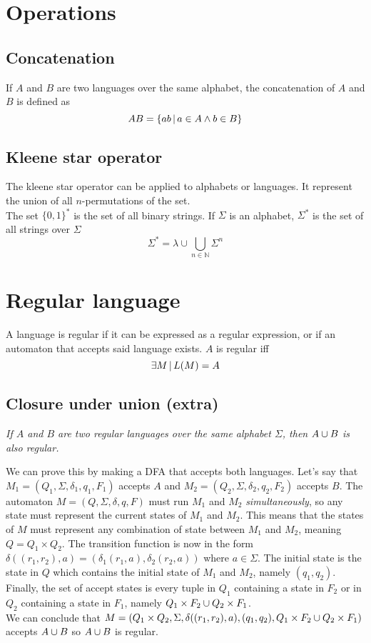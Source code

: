 \documentclass{article}
\newcommand{\emptyString}{\lambda}
\begin{document}
\section{Operations}

\subsection{Concatenation}

If \(A\) and \(B\) are two languages over the same alphabet,
the concatenation of \(A\) and \(B\) is defined as
\[
    AB = \{ab \,|\, a \in A \land b \in B\}
\]

\subsection{Kleene star operator}

The kleene star operator can be applied to alphabets or languages.
It represent the union of all \(n\)-permutations of the set. \\
The set \(\{0,1\}^*\) is the set of
all binary strings. If \(\Sigma\) is an alphabet, \(\Sigma^*\) is the set
of all strings over \(\Sigma\)
\[
    \Sigma^* = \emptyString \cup \bigcup_{n\in\mathbb{N}} \Sigma^n
\]

\section{Regular language}

A language is regular if it can be expressed as a regular expression,
or if an automaton that accepts said language exists.
\(A\) is regular iff
\[
    \exists M \,|\, L(M) = A
\]

\subsection{Closure under union (extra)}

\textit{If \(A\) and \(B\) are two regular languages over the same alphabet
\(\Sigma\), then \(A \cup B\) is also regular.}

We can prove this by making a DFA that accepts both languages.
Let's say that \(M_1=(Q_1, \Sigma, \delta_1, q_1, F_1)\) accepts \(A\)
and \(M_2=(Q_2, \Sigma, \delta_2, q_2, F_2)\) accepts \(B\).
The automaton \(M=(Q, \Sigma, \delta, q, F)\) must run \(M_1\) and \(M_2\) \textit{simultaneously},
so any state must represent the current states of \(M_1\) and \(M_2\).
This means that the states of \(M\) must represent any combination of state between
\(M_1\) and \(M_2\), meaning \(Q=Q_1 \times Q_2\).
The transition function is now in the form
\(\delta((r_1, r_2), a) = (\delta_1(r_1, a), \delta_2(r_2, a))\) where \(a\in\Sigma\).
The initial state is the state in \(Q\) which contains the initial state of \(M_1\)
and \(M_2\), namely \((q_1, q_2)\). Finally, the set of accept states
is every tuple in \(Q_1\) containing a state in \(F_2\) or in \(Q_2\) containing a state in \(F_1\), namely
\(Q_1 \times F_2 \cup Q_2 \times F_1\). \\
We can conclude that \(M=(Q_1 \times Q_2, \Sigma, \delta((r_1, r_2), a), (q_1, q_2), Q_1 \times F_2 \cup Q_2 \times F_1)\)
accepts \(A \cup B\) so \(A \cup B\) is regular.
\end{document}
